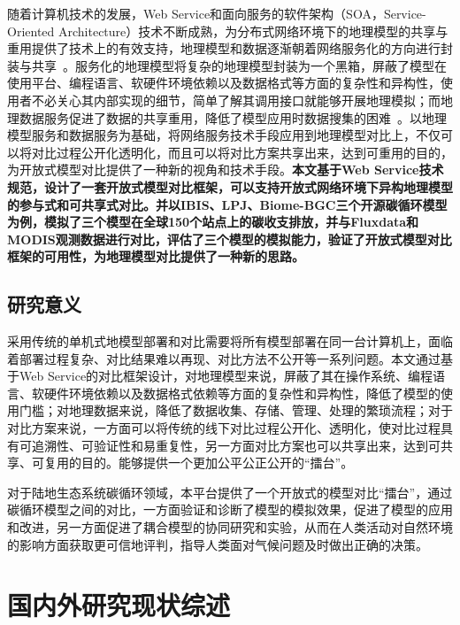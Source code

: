 随着计算机技术的发展，Web Service和面向服务的软件架构（SOA，Service-Oriented Architecture）技术不断成熟，为分布式网络环境下的地理模型的共享与重用提供了技术上的有效支持，地理模型和数据逐渐朝着网络服务化的方向进行封装与共享~\cite{胡迪2015地理模型的服务化封装方法研究}。服务化的地理模型将复杂的地理模型封装为一个黑箱，屏蔽了模型在使用平台、编程语言、软硬件环境依赖以及数据格式等方面的复杂性和异构性，使用者不必关心其内部实现的细节，简单了解其调用接口就能够开展地理模拟；而地理数据服务促进了数据的共享重用，降低了模型应用时数据搜集的困难~\cite{Yue2015A}。以地理模型服务和数据服务为基础，将网络服务技术手段应用到地理模型对比上，不仅可以将对比过程公开化透明化，而且可以将对比方案共享出来，达到可重用的目的，为开放式模型对比提供了一种新的视角和技术手段。\textbf{本文基于Web Service技术规范，设计了一套开放式模型对比框架，可以支持开放式网络环境下异构地理模型的参与式和可共享式对比。并以IBIS、LPJ、Biome-BGC三个开源碳循环模型为例，模拟了三个模型在全球150个站点上的碳收支排放，并与Fluxdata和MODIS观测数据进行对比，评估了三个模型的模拟能力，验证了开放式模型对比框架的可用性，为地理模型对比提供了一种新的思路。}


\subsection{研究意义}
采用传统的单机式地模型部署和对比需要将所有模型部署在同一台计算机上，面临着部署过程复杂、对比结果难以再现、对比方法不公开等一系列问题。本文通过基于Web Service的对比框架设计，对地理模型来说，屏蔽了其在操作系统、编程语言、软硬件环境依赖以及数据格式依赖等方面的复杂性和异构性，降低了模型的使用门槛；对地理数据来说，降低了数据收集、存储、管理、处理的繁琐流程；对于对比方案来说，一方面可以将传统的线下对比过程公开化、透明化，使对比过程具有可追溯性、可验证性和易重复性，另一方面对比方案也可以共享出来，达到可共享、可复用的目的。能够提供一个更加公平公正公开的“擂台”。

对于陆地生态系统碳循环领域，本平台提供了一个开放式的模型对比“擂台”，通过碳循环模型之间的对比，一方面验证和诊断了模型的模拟效果，促进了模型的应用和改进，另一方面促进了耦合模型的协同研究和实验，从而在人类活动对自然环境的影响方面获取更可信地评判，指导人类面对气候问题及时做出正确的决策。

\section{国内外研究现状综述}

